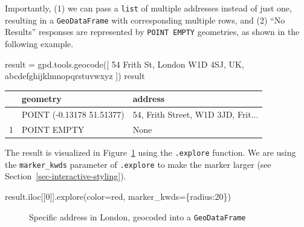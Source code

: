 \documentclass[
  letterpaper,
]{krantz}
\newenvironment{Shaded}{\begin{snugshade}}{\end{snugshade}}
\newcommand{\DecValTok}[1]{\textcolor[rgb]{0.68,0.00,0.00}{#1}}
\newcommand{\NormalTok}[1]{\textcolor[rgb]{0.00,0.23,0.31}{#1}}
\newcommand{\OperatorTok}[1]{\textcolor[rgb]{0.37,0.37,0.37}{#1}}
\newcommand{\StringTok}[1]{\textcolor[rgb]{0.13,0.47,0.30}{#1}}
\begin{document}
Importantly, (1) we can pass a \texttt{list} of multiple addresses
instead of just one, resulting in a \texttt{GeoDataFrame} with
corresponding multiple rows, and (2) ``No Results'' responses are
represented by \texttt{POINT\ EMPTY} geometries, as shown in the
following example.

\begin{Shaded}
\begin{Highlighting}[]
\NormalTok{result }\OperatorTok{=}\NormalTok{ gpd.tools.geocode([}
    \StringTok{\textquotesingle{}54 Frith St, London W1D 4SJ, UK\textquotesingle{}}\NormalTok{, }
    \StringTok{\textquotesingle{}abcdefghijklmnopqrstuvwxyz\textquotesingle{}}
\NormalTok{])}
\NormalTok{result}
\end{Highlighting}
\end{Shaded}

\begin{longtable}[]{@{}lll@{}}
\toprule\noalign{}
& geometry & address \\
\midrule\noalign{}
\endhead
\bottomrule\noalign{}
\endlastfoot
0 & POINT (-0.13178 51.51377) & 54, Frith Street, W1D 3JD, Frit... \\
1 & POINT EMPTY & None \\
\end{longtable}

The result is visualized in Figure~\ref{fig-ox-geocode} using the
\texttt{.explore} function. We are using the \texttt{marker\_kwds}
parameter of \texttt{.explore} to make the marker larger (see
Section~\ref{sec-interactive-styling}).

\begin{Shaded}
\begin{Highlighting}[]
\NormalTok{result.iloc[[}\DecValTok{0}\NormalTok{]].explore(color}\OperatorTok{=}\StringTok{\textquotesingle{}red\textquotesingle{}}\NormalTok{, marker\_kwds}\OperatorTok{=}\NormalTok{\{}\StringTok{\textquotesingle{}radius\textquotesingle{}}\NormalTok{:}\DecValTok{20}\NormalTok{\})}
\end{Highlighting}
\end{Shaded}

\begin{figure}


\caption{\label{fig-ox-geocode}Specific address in London, geocoded into
a \texttt{GeoDataFrame}}

\end{figure}%
\end{document}
